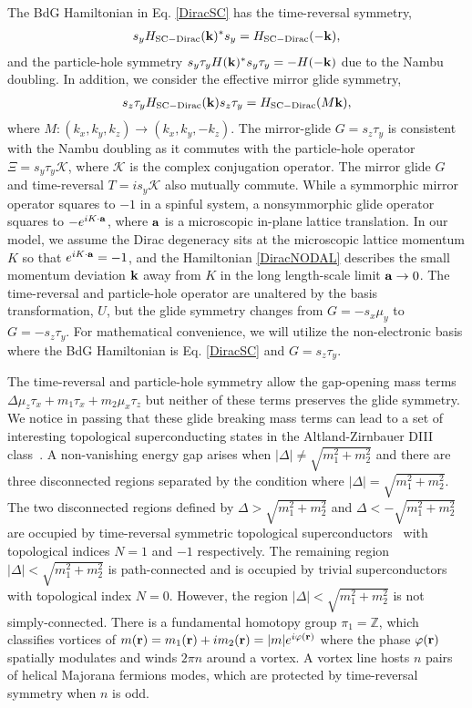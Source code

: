 The BdG Hamiltonian in Eq. \eqref{DiracSC} has the time-reversal symmetry,
\begin{align}
s_yH_{\mathrm{SC-Dirac}}({\bf k})^\ast s_y=H_{\mathrm{SC-Dirac}}(-{\bf k}),
\label{DiracNODALHTR}
\end{align} and the particle-hole symmetry $s_y\tau_yH({\bf k})^\ast s_y\tau_y=-H(-{\bf k})$ due to the Nambu doubling. In addition, we consider the effective mirror glide symmetry,
\begin{align}
s_z\tau_yH_{\mathrm{SC-Dirac}}({\bf k})s_z\tau_y=H_{\mathrm{SC-Dirac}}(M{\bf k}),
\label{DiracNODALHglide}
\end{align}
where $M:(k_x,k_y,k_z)\to(k_x,k_y,-k_z)$. The mirror-glide $G=s_z\tau_y$ is consistent with the Nambu doubling as it commutes with the particle-hole operator $\Xi=s_y\tau_y\mathcal{K}$, where $\mathcal{K}$ is the complex conjugation operator. The mirror glide $G$ and time-reversal $T=is_y\mathcal{K}$ also mutually commute. While a symmorphic mirror operator squares to $-1$ in a spinful system, a nonsymmorphic glide operator squares to $-e^{iK\cdot{\bf a}}$, where ${\bf a}$ is a microscopic in-plane lattice translation. In our model, we assume the Dirac degeneracy sits at the microscopic lattice momentum $K$ so that $e^{iK\cdot{\bf a}}=-1$, and the Hamiltonian \eqref{DiracNODAL} describes the small momentum deviation ${\bf k}$ away from $K$ in the long length-scale limit ${\bf a}\to0$. The time-reversal and particle-hole operator are unaltered by the basis transformation, $U$, but the glide symmetry changes from $G=-s_x\mu_y$ to $G=-s_z\tau_y$. For mathematical convenience, we will utilize the non-electronic basis where the BdG Hamiltonian is Eq. \eqref{DiracSC} and $G=s_z\tau_y$.

The time-reversal and particle-hole symmetry allow the gap-opening mass terms $\Delta\mu_z\tau_x+m_1\tau_x+m_2\mu_x\tau_z$ but neither of these terms preserves the glide symmetry. We notice in passing that these glide breaking mass terms can lead to a set of interesting topological superconducting states in the Altland-Zirnbauer DIII class~\cite{AltlandZirnbauer97}. A non-vanishing energy gap arises when $|\Delta|\neq\sqrt{m_1^2+m_2^2}$ and there are three disconnected regions separated by the condition where $|\Delta|=\sqrt{m_1^2+m_2^2}$. The two disconnected regions defined by $\Delta>\sqrt{m_1^2+m_2^2}$ and $\Delta<-\sqrt{m_1^2+m_2^2}$ are occupied by time-reversal symmetric topological superconductors~\cite{Ryu2008,Kitaevtable08} with topological indices $N=1$ and $-1$ respectively. The remaining region $|\Delta|<\sqrt{m_1^2+m_2^2}$ is path-connected and is occupied by trivial superconductors with topological index $N=0$. However, the region $|\Delta|<\sqrt{m_1^2+m_2^2}$ is not simply-connected. There is a fundamental homotopy group $\pi_1=\mathbb{Z}$, which classifies vortices of $m({\bf r})=m_1({\bf r})+im_2({\bf r})=|m|e^{i\varphi({\bf r})}$ where the phase $\varphi({\bf r})$ spatially modulates and winds $2\pi n$ around a vortex. A vortex line hosts $n$ pairs of helical Majorana fermions modes, which are protected by time-reversal symmetry when $n$ is odd.


